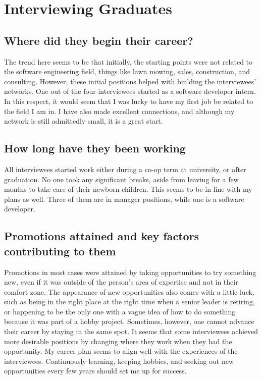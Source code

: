 \section{Interviewing Graduates}
\subsection{Where did they begin their career?}
The trend here seems to be that initially, the starting points were not related
to the software engineering field, things like lawn mowing, sales,
construction, and consulting. However, these initial positions helped with
building the interviewees' networks. One out of the four interviewees
started as a software developer intern. In this respect, it would seem that I
was lucky to have my first job be related to the field I am in. I have also
made excellent connections, and although my network is still admittedly small,
it is a great start.

\subsection{How long have they been working}
All interviewees started work either during a co-op term at university, or
after graduation. No one took any significant breaks, aside from leaving for a
few months to take care of their newborn children. This seems to be in line
with my plans as well. Three of them are in manager positions, while one is a
software developer. 

\subsection{Promotions attained and key factors contributing to them}
Promotions in most cases were attained by taking opportunities to try something
new, even if it was outside of the person's area of expertise and not in their
comfort zone. The appearance of new opportunities also comes with a little
luck, such as being in the right place at the right time when a senior leader
is retiring, or happening to be the only one with a vague idea of how to do
something because it was part of a hobby project. Sometimes, however, one
cannot advance their career by staying in the same spot. It seems that some
interviewees achieved more desirable positions by changing where they work when
they had the opportunity. My career plan seems to align well with the
experiences of the interviewees. Continuously learning, keeping hobbies, and
seeking out new opportunities every few years should set me up for success. 


